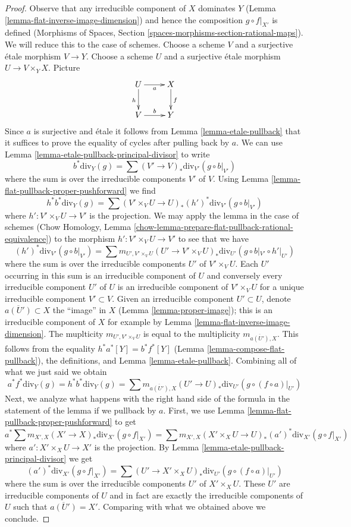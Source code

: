 \documentclass[10pt,a4paper]{amsart}
\theoremstyle{plain}
\theoremstyle{definition}
\theoremstyle{remark}
\numberwithin{equation}{subsection}
\begin{document}
\begin{proof}
Observe that any irreducible component of $X$ dominates $Y$
(Lemma \ref{lemma-flat-inverse-image-dimension})
and hence the composition $g \circ f|_{X'}$ is defined
(Morphisms of Spaces, Section \ref{spaces-morphisms-section-rational-maps}).
We will reduce this to the case of schemes. Choose a scheme $V$ and a
surjective \'etale morphism $V \to Y$. Choose a scheme $U$ and a surjective
\'etale morphism $U \to V \times_Y X$. Picture
$$
\xymatrix{
U \ar[r]_a \ar[d]_h & X \ar[d]^f \\
V \ar[r]^b & Y
}
$$
Since $a$ is surjective and \'etale it follows from
Lemma \ref{lemma-etale-pullback} that it suffices to prove the
equality of cycles after pulling back by $a$.
We can use Lemma \ref{lemma-etale-pullback-principal-divisor} to write
$$
b^*\text{div}_Y(g) = \sum (V' \to V)_*\text{div}_{V'}(g \circ b|_{V'})
$$
where the sum is over the irreducible components $V'$ of $V$.
Using Lemma \ref{lemma-flat-pullback-proper-pushforward} we find
$$
h^*b^*\text{div}_Y(g) =
\sum (V' \times_V U \to U)_*(h')^*\text{div}_{V'}(g \circ b|_{V'})
$$
where $h' : V' \times_V U \to V'$ is the projection.
We may apply the lemma in the case of schemes
(Chow Homology, Lemma
\ref{chow-lemma-prepare-flat-pullback-rational-equivalence})
to the morphism $h' : V' \times_V U \to V'$ to see that we have
$$
(h')^*\text{div}_{V'}(g \circ b|_{V'}) =
\sum
m_{U', V' \times_V U}
(U' \to V' \times_V U)_*\text{div}_{U'}(g \circ b|_{V'} \circ h'|_{U'})
$$
where the sum is over the irreducible components $U'$ of $V' \times_V U$.
Each $U'$ occurring in this sum is an irreducible component of $U$
and conversely every irreducible component $U'$ of $U$ is an
irreducible component of $V' \times_V U$
for a unique irreducible component $V' \subset V$.
Given an irreducible component $U' \subset U$,
denote $\overline{a(U')} \subset X$ the ``image'' in $X$
(Lemma \ref{lemma-proper-image}); this
is an irreducible component of $X$ for example by
Lemma \ref{lemma-flat-inverse-image-dimension}.
The muplticity $m_{U', V' \times_V U}$ is equal to
the multiplicity $m_{\overline{a(U')}, X}$.
This follows from the equality $h^*a^*[Y] = b^*f^*[Y]$
(Lemma \ref{lemma-compose-flat-pullback}), the definitions, and
Lemma \ref{lemma-etale-pullback}.
Combining all of what we just said we obtain
$$
a^*f^*\text{div}_Y(g) =
h^*b^*\text{div}_Y(g) =
\sum m_{\overline{a(U')}, X}
(U' \to U)_*\text{div}_{U'}(g \circ (f \circ a)|_{U'})
$$
Next, we analyze what happens with the right hand side of the
formula in the statement of the lemma if we pullback by $a$.
First, we use Lemma \ref{lemma-flat-pullback-proper-pushforward}
to get
$$
a^*\sum m_{X', X} (X' \to X)_*\text{div}_{X'}(g \circ f|_{X'}) =
\sum m_{X', X} (X' \times_X U \to U)_*(a')^*\text{div}_{X'}(g \circ f|_{X'})
$$
where $a' : X' \times_X U \to X'$ is the projection.
By Lemma \ref{lemma-etale-pullback-principal-divisor}
we get
$$
(a')^*\text{div}_{X'}(g \circ f|_{X'}) =
\sum (U' \to X' \times_X U)_*\text{div}_{U'}(g \circ (f \circ a)|_{U'})
$$
where the sum is over the irreducible components $U'$ of $X' \times_X U$.
These $U'$ are irreducible components of $U$ and in fact are exactly the
irreducible components of $U$ such that $\overline{a(U')} = X'$.
Comparing with what we obtained above we conclude.
\end{proof}
\end{document}
